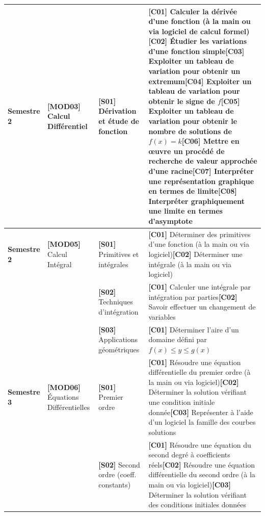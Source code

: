 \documentclass[a4paper,10pt,landscape]{article}
\begin{document}
\begin{longtable}{>{\raggedright\arraybackslash}p{2.2cm} >{\raggedright\arraybackslash}p{3cm} >{\raggedright\arraybackslash}p{3.5cm} >{\raggedright\arraybackslash}p{13.2cm}}
\midrule
\textbf{Semestre 2} & \textbf{[MOD03]} Calcul Différentiel & \textbf{[S01]} Dérivation et étude de fonction & \textbf{[C01]} Calculer la dérivée d'une fonction (à la main ou via logiciel de calcul formel)\newline \textbf{[C02]} Étudier les variations d'une fonction simple\newline \textbf{[C03]} Exploiter un tableau de variation pour obtenir un extremum\newline \textbf{[C04]} Exploiter un tableau de variation pour obtenir le signe de $f$\newline \textbf{[C05]} Exploiter un tableau de variation pour obtenir le nombre de solutions de $f(x) = k$\newline \textbf{[C06]} Mettre en œuvre un procédé de recherche de valeur approchée d'une racine\newline \textbf{[C07]} Interpréter une représentation graphique en termes de limite\newline \textbf{[C08]} Interpréter graphiquement une limite en termes d'asymptote \\
\midrule
\textbf{Semestre 2} & \textbf{[MOD05]} Calcul Intégral & \textbf{[S01]} Primitives et intégrales & \textbf{[C01]} Déterminer des primitives d'une fonction (à la main ou via logiciel)\newline \textbf{[C02]} Déterminer une intégrale (à la main ou via logiciel) \\
\cmidrule(l){3-4}
 &  & \textbf{[S02]} Techniques d'intégration & \textbf{[C01]} Calculer une intégrale par intégration par parties\newline \textbf{[C02]} Savoir effectuer un changement de variables \\
\cmidrule(l){3-4}
 &  & \textbf{[S03]} Applications géométriques & \textbf{[C01]} Déterminer l'aire d'un domaine défini par $f(x) \leq y \leq g(x)$ \\
\midrule
\textbf{Semestre 3} & \textbf{[MOD06]} Équations Différentielles & \textbf{[S01]} Premier ordre & \textbf{[C01]} Résoudre une équation différentielle du premier ordre (à la main ou via logiciel)\newline \textbf{[C02]} Déterminer la solution vérifiant une condition initiale donnée\newline \textbf{[C03]} Représenter à l'aide d'un logiciel la famille des courbes solutions \\
\cmidrule(l){3-4}
 &  & \textbf{[S02]} Second ordre (coeff. constants) & \textbf{[C01]} Résoudre une équation du second degré à coefficients réels\newline \textbf{[C02]} Résoudre une équation différentielle du second ordre (à la main ou via logiciel)\newline \textbf{[C03]} Déterminer la solution vérifiant des conditions initiales données \\

\end{longtable}
\end{document}
